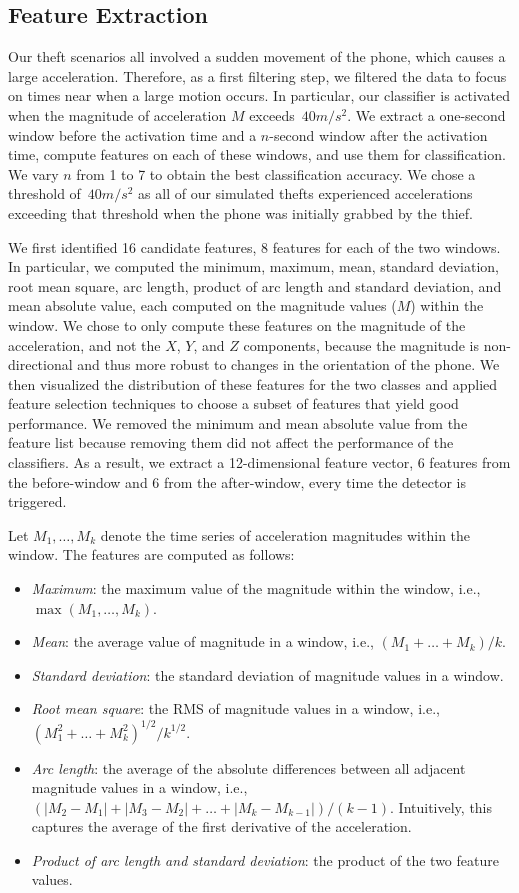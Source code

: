 \subsection{Feature Extraction}
\label{s:features}

Our theft scenarios all involved a sudden movement of the phone, which causes a large acceleration.
Therefore, as a first filtering step, we filtered the data to focus on times near when a large motion occurs.
In particular, our classifier is activated when the magnitude of acceleration $M$ exceeds~$40 m/s^2$.
We extract a one-second window before the activation time and a $n$-second window after the activation time, compute features on each of these windows, and use them for classification.
We vary $n$ from 1 to 7 to obtain the best classification accuracy.
We chose a threshold of~$40 m/s^2$ as all of our simulated thefts experienced accelerations exceeding that threshold when the phone was initially grabbed by the thief.

We first identified 16 candidate features, 8 features for each of the two windows.
In particular, we computed the minimum, maximum, mean, standard deviation, root mean square, arc length, product of arc length and standard deviation, and mean absolute value, each computed on the magnitude values ($M$) within the window.
We chose to only compute these features on the magnitude of the acceleration, and not the $X$, $Y$, and $Z$ components, because the magnitude is non-directional and thus more robust to changes in the orientation of the phone. 
We then visualized the distribution of these features for the two classes and applied feature selection techniques to choose a subset of features that yield good performance.
We removed the minimum and mean absolute value from the feature list because removing them did not affect the performance of the classifiers. 
As a result, we extract a 12-dimensional feature vector, 6 features from the before-window and 6 from the after-window, every time the detector is triggered.

Let $M_1,\dots,M_k$ denote the time series of acceleration magnitudes within the window.
The features are computed as follows:
\begin{itemize}
\item \emph{Maximum}: the maximum value of the magnitude within the window, i.e., $\max(M_1,\dots,M_k)$.
\item \emph{Mean}: the average value of magnitude in a window, i.e., $(M_1+\dots + M_k)/k$.
\item \emph{Standard deviation}: the standard deviation of magnitude values in a window.
\item \emph{Root mean square}: the RMS of magnitude values in a window, i.e., $(M_1^2 + \dots + M_k^2)^{1/2}/k^{1/2}$.
\item \emph{Arc length}: the average of the absolute differences between all adjacent magnitude values in a window, i.e., $(|M_2-M_1| + |M_3-M_2| + \dots + |M_k-M_{k-1}|)/(k-1)$.
Intuitively, this captures the average of the first derivative of the acceleration.
\item \emph{Product of arc length and standard deviation}: the product of the two feature values.
\end{itemize}

